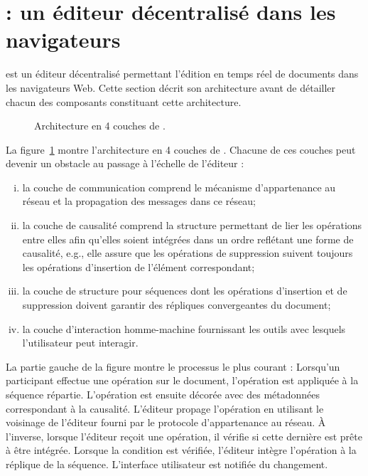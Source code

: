
\section{\CRATE : un éditeur décentralisé dans les navigateurs}
\label{editor:sec:crate}

\CRATE est un éditeur décentralisé permettant l'édition en temps réel de
documents dans les navigateurs Web. Cette section décrit son architecture avant
de détailler chacun des composants constituant cette architecture.

\begin{figure}
  \begin{center}
    
    \caption[Architecture de \CRATE]
    {\label{editor:fig:architecture}Architecture en 4 couches de \CRATE.}
  \end{center}
\end{figure}

La figure~\ref{editor:fig:architecture} montre l'architecture en 4 couches de
\CRATE. Chacune de ces couches peut devenir un obstacle au passage à l'échelle
de l'éditeur :
\begin{enumerate}[(i)]
\item la couche de communication comprend le mécanisme d'appartenance au réseau
  et la propagation des messages dans ce réseau;
\item la couche de causalité comprend la structure permettant de lier les
  opérations entre elles afin qu'elles soient intégrées dans un ordre reflétant
  une forme de causalité, e.g., elle assure que les opérations de suppression
  suivent toujours les opérations d'insertion de l'élément correspondant;
\item la couche de structure pour séquences dont les opérations d'insertion et
  de suppression doivent garantir des répliques convergeantes du document;
\item la couche d'interaction homme-machine fournissant les outils avec lesquels
  l'utilisateur peut interagir.
\end{enumerate}

\noindent La partie gauche de la figure montre le processus le plus courant :
Lorsqu'un participant effectue une opération sur le document, l'opération est
appliquée à la séquence répartie. L'opération est ensuite décorée avec des
métadonnées correspondant à la causalité. L'éditeur propage l'opération en
utilisant le voisinage de l'éditeur fourni par le protocole d'appartenance au
réseau.  À l'inverse, lorsque l'éditeur reçoit une opération, il vérifie si
cette dernière est prête à être intégrée. Lorsque la condition est vérifiée,
l'éditeur intègre l'opération à la réplique de la séquence. L'interface
utilisateur est notifiée du changement.

